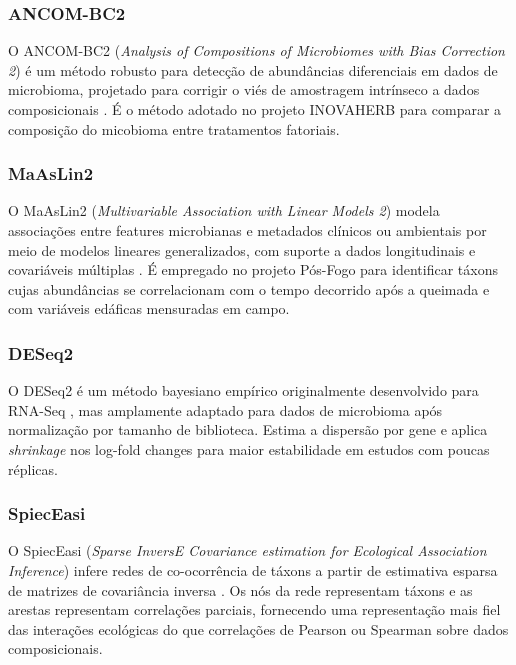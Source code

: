 \subsubsection{ANCOM-BC2}

O ANCOM-BC2 (\textit{Analysis of Compositions of Microbiomes with
Bias Correction 2}) é um método robusto para detecção de abundâncias
diferenciais em dados de microbioma, projetado para corrigir o viés
de amostragem intrínseco a dados composicionais
\cite{lin2022analysis}. É o método adotado no projeto INOVAHERB para
comparar a composição do micobioma entre tratamentos fatoriais.

\subsubsection{MaAsLin2}

O MaAsLin2 (\textit{Multivariable Association with Linear Models 2})
modela associações entre features microbianas e metadados clínicos ou
ambientais por meio de modelos lineares generalizados, com suporte a
dados longitudinais e covariáveis múltiplas \cite{mallick2021multivariable}.
É empregado no projeto Pós-Fogo para identificar táxons cujas
abundâncias se correlacionam com o tempo decorrido após a queimada e
com variáveis edáficas mensuradas em campo.

\subsubsection{DESeq2}

O DESeq2 é um método bayesiano empírico originalmente desenvolvido
para RNA-Seq \cite{love2014moderated}, mas amplamente adaptado para
dados de microbioma após normalização por tamanho de biblioteca. Estima
a dispersão por gene e aplica \textit{shrinkage} nos log-fold changes
para maior estabilidade em estudos com poucas réplicas.

\subsubsection{SpiecEasi}

O SpiecEasi (\textit{Sparse InversE Covariance estimation for
Ecological Association Inference}) infere redes de co-ocorrência de
táxons a partir de estimativa esparsa de matrizes de covariância inversa
\cite{kurtz2015sparse}. Os nós da rede representam táxons e as arestas
representam correlações parciais, fornecendo uma representação mais
fiel das interações ecológicas do que correlações de Pearson ou
Spearman sobre dados composicionais.

